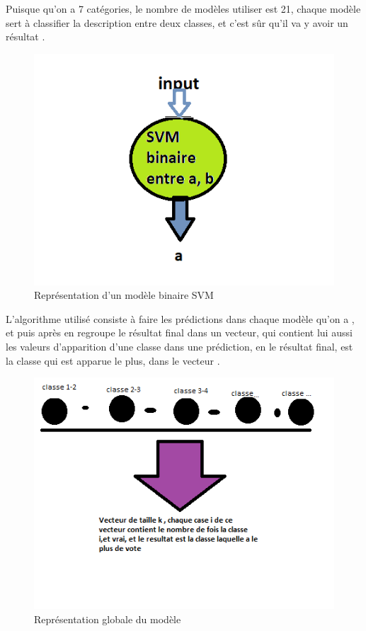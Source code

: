 Puisque qu'on a 7 catégories, le nombre de modèles utiliser est 21, chaque modèle sert à classifier la description entre deux classes, et c'est sûr qu'il va y avoir un résultat .
\begin{figure}[H]
	\begin{center}
	\includegraphics[scale=0.7]{Images/svm_binaire.png}
	\end{center}
	\caption{Représentation d'un modèle binaire SVM}
	\label{fig:svm0}
\end{figure}
L'algorithme utilisé consiste à faire les prédictions dans chaque modèle qu'on a , et puis après en regroupe le résultat final dans un vecteur, qui contient lui aussi les valeurs d'apparition d'une classe dans une prédiction, en le résultat final, est la classe qui est apparue le plus, dans le vecteur .
\begin{figure}[H]
	\begin{center}
	\includegraphics[scale=0.7]{Images/svm_rep.png}
	\end{center}
	\caption{Représentation globale du modèle}
	\label{fig:svm0}
\end{figure}



